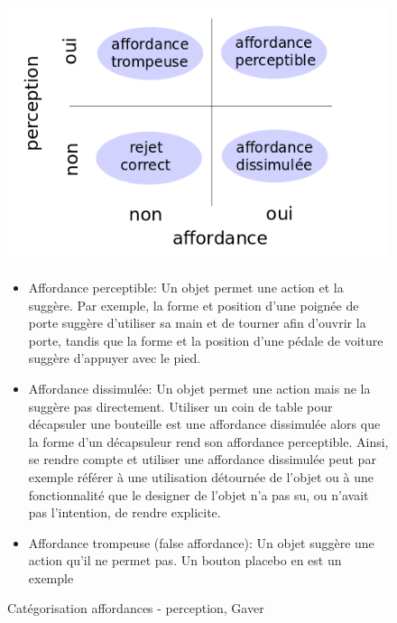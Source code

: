                 \begin{figure}[!h]
                \begin{minipage}{0.45\linewidth}
                    \centering
                    \includegraphics[width=\linewidth]{Figures/Gaver-Cat_affordances.png}
                    \caption{Catégorisation affordances - perception, Gaver~}
                    \label{fig:affordance}
                \end{minipage}
                \begin{minipage}{0.495\linewidth}
                \myDefautStyle
                    \begin{itemize}\myItemStyle
                        \item Affordance perceptible: Un objet permet une action et la suggère. Par exemple, la forme et position d'une poignée de porte suggère d'utiliser sa main et de tourner afin d'ouvrir la porte, tandis que la forme et la position d'une pédale de voiture suggère d'appuyer avec le pied.
                    \end{itemize}{}\par%
                \end{minipage}
                \myDefautStyle
                \begin{itemize}\myItemStyle
                    \item Affordance dissimulée: Un objet permet une action mais ne la suggère pas directement. Utiliser un coin de table pour décapsuler une bouteille est une affordance dissimulée alors que la forme d'un décapsuleur rend son affordance perceptible. Ainsi, se rendre compte et utiliser une affordance dissimulée peut par exemple référer à une utilisation détournée de l'objet ou à une fonctionnalité que le designer de l'objet n'a pas su, ou n'avait pas l'intention, de rendre explicite.
                    \item Affordance trompeuse (false affordance): Un objet suggère une action qu'il ne permet pas. Un bouton placebo en est un exemple
                \end{itemize}{}
                \end{figure}{}
